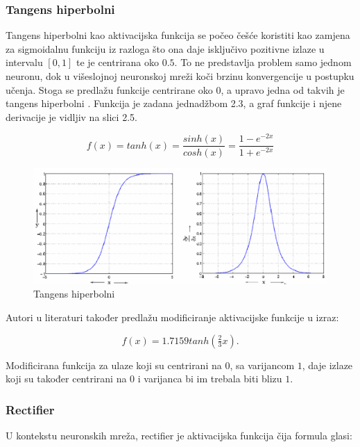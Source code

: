 \documentclass[times, utf8, diplomski]{fer}
\begin{document}
\subsubsection{Tangens hiperbolni}
Tangens hiperbolni kao aktivacijska funkcija se počeo češće koristiti kao zamjena za sigmoidalnu funkciju iz razloga što ona daje isključivo pozitivne izlaze u intervalu $[0, 1]$ te je centrirana oko $0.5$. To ne predstavlja problem samo jednom neuronu, dok u višeslojnoj neuronskoj mreži koči brzinu konvergencije u postupku učenja. Stoga se predlažu funkcije centrirane oko $0$, a upravo jedna od takvih je tangens hiperbolni \cite{efficient}. Funkcija je zadana jednadžbom 2.3, a graf funkcije i njene derivacije je vidljiv na slici 2.5.

\begin{equation}
    f(x)=tanh(x)=\frac{sinh(x)}{cosh(x)}=\frac{1 - e^{-2x}}{1 + e^{-2x}}
\end{equation}

\begin{figure}[htbp]
    \centering
    \includegraphics[scale=0.5]{Slike/tanh}
    \caption{Tangens hiperbolni \cite{tanh}}
\end{figure}

Autori u literaturi \cite{efficient} također predlažu modificiranje aktivacijske funkcije u izraz:

\begin{equation}
    f(x)=1.7159 tanh\left( \tfrac{2}{3}x \right).
\end{equation}

Modificirana funkcija za ulaze koji su centrirani na $0$, sa varijancom $1$, daje izlaze koji su također centrirani na $0$ i varijanca bi im trebala biti blizu $1$.

\subsubsection{Rectifier}

U kontekstu neuronskih mreža, rectifier je aktivacijska funkcija čija formula glasi:
\end{document}
